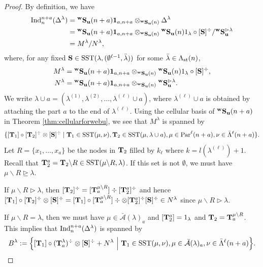 \begin{proof}
    By definition, we have 
    \begin{align*}
        \operatorname{Ind}\nolimits^{n+a}_{n} (\Delta^\lambda)&= {}^{\bold{w}}\bold{S}_{\mathbf{u}}(n+a) \textbf{1}_{a,n+a}\otimes _{{}^{\bold{w}}\bold{S}_{\mathbf{u}}(n)} \Delta^\lambda\\
        &={}^{\bold{w}}\bold{S}_{\mathbf{u}}(n+a) \textbf{1}_{a,n+a}\otimes _{{}^{\bold{w}}\bold{S}_{\mathbf{u}}(n)}  {}^{\bold{w}}\bold{S}_{\mathbf{u}}(n) 1_\lambda\circ [\mathbf{S}]^\div / {}^{\bold{w}}\bold{S}_{\mathbf{u}}^{\rhd\lambda }\\
        &= M^\lambda/N^\lambda,
    \end{align*} 
    where, for any fixed $\mathbf{S}\in \text{SST}(\lambda, (\emptyset^{\ell-1},\bar \lambda))$ for some $\bar\lambda\in\Lambda_{\text{st}}(n)$,
   \begin{align*}
       M^\lambda&= {}^{\bold{w}}\bold{S}_{\mathbf{u}}(n+a) \textbf{1}_{a,n+a}\otimes _{{}^{\bold{w}}\bold{S}_{\mathbf{u}}(n)}  {}^{\bold{w}}\bold{S}_{\mathbf{u}}(n) 1_\lambda\circ [\mathbf{S}]^\div, \\  N^\lambda&={}^{\bold{w}}\bold{S}_{\mathbf{u}}(n+a) \textbf{1}_{a,n+a}\otimes _{{}^{\bold{w}}\bold{S}_{\mathbf{u}}(n)}{}^{\bold{w}}\bold{S}_{\mathbf{u}}^{\rhd\lambda }.
   \end{align*} 
    We write $\lambda\cup a=(\lambda^{(1)}, \lambda^{(2)},\ldots ,\lambda^{(\ell)}\cup a)$, where $\lambda^{(\ell)}\cup a $ is obtained by attaching the part $a$ to the end of $\lambda^{(\ell)}$. Using the cellular basis of ${}^{\bold{w}}\bold{S}_{\mathbf{u}}(n+a)$ in Theorem \ref{thm:cellularforwebu}, we see that 
    $M^\lambda$ is spanned by 
\[\{ [\mathbf{T}_1]\circ [\mathbf{T}_2]^\div \otimes [\mathbf{S}]^\div \mid \mathbf{T}_1\in \text{SST}(\mu, \nu), \mathbf{T}_2\in \text{SST}(\mu, \lambda\cup a), \mu\in \text{Par}^\ell(n+a), \nu \in \bar\Lambda^{\ell}(n+a)\}.\]
Let $R=\{x_1,\ldots,x_a\}$ be the nodes in $\mathbf{T}_2$ filled by $k_\ell$ where $k=l(\lambda^{(\ell)})+1$. 
Recall that  $\mathbf{T}_2^a=\mathbf{T}_2\backslash R\in \text{SST}(\mu\backslash R, \lambda)$.  If this set is not $\emptyset$, we must have $ \mu\backslash R\unrhd \lambda$. %

If $ \mu \backslash R\rhd \lambda$, then $ [\mathbf{T}_2 ]^\div= [\mathbf{T}_a^{\mu\backslash R}]\div [\mathbf{T}_2^a]^\div $ 
and hence $ [\mathbf{T}_1]\circ [\mathbf{T}_2]^\div \otimes [\mathbf{S}]^\div=[\mathbf{T}_1]\circ[\mathbf{T}_a^{\mu\backslash R}]\div\otimes [\mathbf{T}_2^a]^\div[\mathbf{S}]^\div \in N^\lambda  $ since $ \mu \backslash R\rhd \lambda$. 

If $\mu \backslash R =\lambda$, then we must have $\mu\in \bar{\mathcal A}(\lambda)_a$  and $[\mathbf{T}_2^a]=1_\lambda$ and $\mathbf{T}_2=\mathbf{T}_a^{\mu\backslash R} $.
This implies that $ \operatorname{Ind}\nolimits^{n+a}_{n} (\Delta^\lambda)$ is spanned by 
\[
B^\lambda :=\Big\{[\mathbf{T}_1]\circ (\mathbf{T}_a^{\lambda})^\div \otimes [\mathbf{S}]^\div  +N^\lambda ~\Big |~ \mathbf{T}_1\in \text{SST}(\mu,\nu),\mu\in  \bar{\mathcal A}(\lambda)_a , \nu \in \bar\Lambda^{\ell}(n+a) \Big\}.
\] 


\end{proof}
